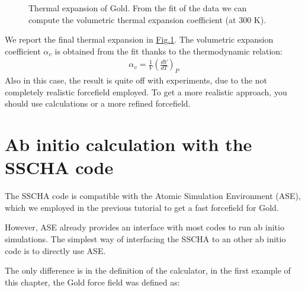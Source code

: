 \documentclass[a4paper,11pt,english]{sphinxmanual}
\let\sphinxpxdimen\pdfpxdimen\else\newdimen\sphinxpxdimen
\begin{document}
\begin{figure}[htbp]
\centering
\capstart

\noindent\sphinxincludegraphics[width=450\sphinxpxdimen]{{thermal_expansion}.png}
\caption{Thermal expansion of Gold. From the fit of the data we can compute the volumetric
thermal expansion coefficient (at 300 K).}\label{\detokenize{start:id4}}\label{\detokenize{start:fig-goldexpansion}}\end{figure}

\sphinxAtStartPar
We report the final thermal expansion in \hyperref[\detokenize{start:fig-goldexpansion}]{Fig.\@ \ref{\detokenize{start:fig-goldexpansion}}}.
The volumetric expansion coefficient \(\alpha_v\) is obtained from the fit
thanks to the thermodynamic relation:
\begin{equation*}
\begin{split}\alpha_v = \frac{1}{V} \left(\frac{dV}{dT}\right)_P\end{split}
\end{equation*}
\sphinxAtStartPar
Also in this case, the result is quite off with experiments, due to the not completely realistic force\sphinxhyphen{}field employed. To get a more realistic approach, you should use  calculations or a more refined force\sphinxhyphen{}field.


\section{Ab initio calculation with the SSCHA code}
\label{\detokenize{start:ab-initio-calculation-with-the-sscha-code}}
\sphinxAtStartPar
The SSCHA code is compatible with the Atomic Simulation Environment (ASE), which we employed in the previous tutorial to get a fast force\sphinxhyphen{}field for Gold.

\sphinxAtStartPar
However, ASE already provides an interface with most codes to run ab initio simulations.
The simplest way of interfacing the SSCHA to an other ab initio code is to directly use ASE.

\sphinxAtStartPar
The only difference is in the definition of the calculator, in the first example of this chapter, the Gold force field was defined as:

\begin{sphinxVerbatim}[commandchars=\\\{\}]
 
   
  
\end{sphinxVerbatim}
\end{document}
